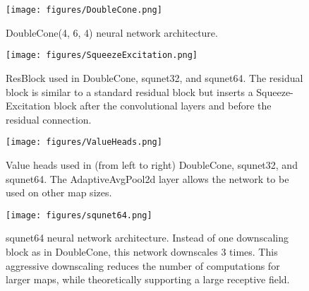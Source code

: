 \documentclass{article}
\begin{document}
\begin{figure}[H]
    \begin{center}
        \texttt{[image: figures/DoubleCone.png]}
    \end{center}
    \caption{DoubleCone(4, 6, 4) neural network architecture.}
    \label{fig:doublecone}
\end{figure}

\begin{figure}[H]
    \begin{center}
        \texttt{[image: figures/SqueezeExcitation.png]}
    \end{center}
    \caption{ResBlock used in DoubleCone, squnet32, and squnet64. The residual block is similar to a standard residual block but inserts a Squeeze-Excitation block after the convolutional layers and before the residual connection.}
    \label{fig:squeezeexcitation}
\end{figure}

\begin{figure}[H]
    \begin{center}
        \texttt{[image: figures/ValueHeads.png]}
    \end{center}
    \caption{Value heads used in (from left to right) DoubleCone, squnet32, and
    squnet64. The AdaptiveAvgPool2d layer allows the network to be used on other map
    sizes.}
    \label{fig:valueheads}
\end{figure}

\begin{figure}[H]
    \begin{center}
        \texttt{[image: figures/squnet64.png]}
    \end{center}
    \caption{squnet64 neural network architecture. Instead of one downscaling block as in DoubleCone, this network downscales 3 times. This aggressive downscaling reduces the number of computations for larger maps, while theoretically supporting a large receptive field.}
    \label{fig:squnet}
\end{figure}
        
\end{document}
